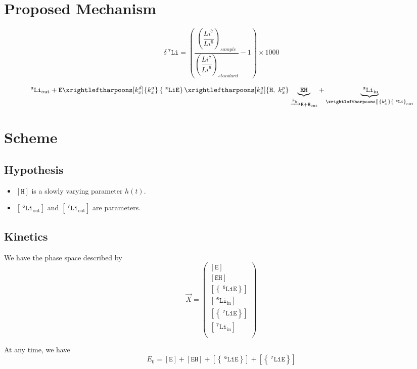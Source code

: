 \documentclass[aps,onecolumn,12pt]{revtex4}
\newcommand{\mychem}[1]{\mathtt{#1}}
\newcommand{\myconc}[1]{\left\lbrack{#1}\right\rbrack}
\newcommand{\spLi}[1]{{~^{\mychem{#1}}\mychem{Li}}}
\newcommand{\spEout}{\mychem{E}}
\newcommand{\Eout}{\myconc{\spEout}}
\newcommand{\spLiE}[1]{\left\lbrace\spLi{#1}\spEout\right\rbrace}
\newcommand{\LiE}[1]{\myconc{\spLiE{#1}}}
\newcommand{\spLiIn}[1]{{\spLi{#1}}_{\mathrm{in}}}
\newcommand{\LiIn}[1]{\myconc{\spLiIn{#1}}}
\newcommand{\spLiOut}[1]{{\spLi{#1}}_{\mathrm{out}}}
\newcommand{\LiOut}[1]{\myconc{\spLiOut{#1}}}
\newcommand{\spEHin}{\mychem{EH}}
\newcommand{\EHin}{\myconc{\spEHin}}
\newcommand{\spproton}{\mychem{H}}
\newcommand{\proton}{\myconc{\spproton}}
\newcommand{\deltaLi}{ {\delta\!\!\spLi{7}} }
\begin{document}
\section{Proposed Mechanism}
$$
	\deltaLi = \left(
		\dfrac{\left(\dfrac{Li^7}{Li^6}\right)_{sample}}
		{\left(\dfrac{Li^7}{Li^6}\right)_{standard}}
		 -1 
	\right) \times 1000
$$


\begin{equation}
	 \spLiOut{x} +  \spEout  
	 \xrightleftharpoons[k_x^d]{k_x^a} 
	 \spLiE{x}
	  \xrightleftharpoons[k_x^q]{\mychem{H},\;k_x^p} \underbrace{\spEHin}_{\xrightarrow[]{k_h} \mychem{E} + \mychem{H}_{\mathrm{out}}} + \underbrace{\spLiIn{x}}_{\xrightleftharpoons[]{k_x^l} \spLiOut{x}}
\end{equation}

\section{Scheme}

\subsection{Hypothesis}
\begin{itemize}
\item $\proton$ is a slowly varying parameter $h(t)$.
\item $\LiOut{6}$ and  $\LiOut{7}$ are parameters.
\end{itemize}

\subsection{Kinetics}
We have the phase space described by
\begin{equation}
 \vec{X} = 
        \begin{pmatrix}
        \Eout\\
        \EHin\\
        \LiE{6}\\
        \LiIn{6}\\
        \LiE{7}\\
        \LiIn{7}\\
        \end{pmatrix}
\end{equation}

At any time, we  have
\begin{equation} 
	\label{eq:E0}
	E_0 = \Eout + \EHin +  \LiE{6} + \LiE{7}
\end{equation}
\end{document}

